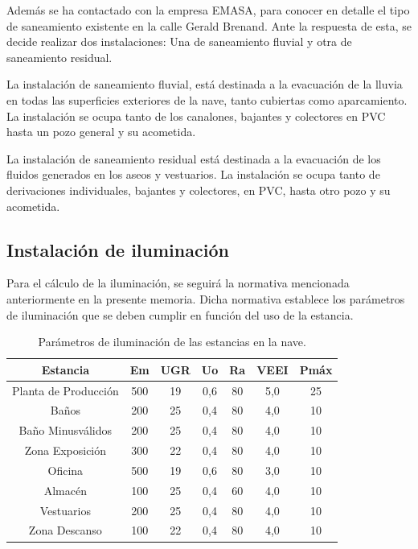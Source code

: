 \documentclass[../main.tex]{subfiles}
\begin{document}
Además se ha contactado con la empresa EMASA, para conocer en detalle el tipo de saneamiento existente en la calle Gerald Brenand. Ante la respuesta de esta, se decide realizar dos instalaciones: Una de saneamiento fluvial y otra de saneamiento residual. 

La instalación de saneamiento fluvial, está destinada a la evacuación de la lluvia en todas las superficies exteriores de la nave, tanto cubiertas como aparcamiento. La instalación se ocupa tanto de los canalones, bajantes y colectores en PVC hasta un pozo general y su acometida.

La instalación de saneamiento residual está destinada a la evacuación de los fluidos generados en los aseos y vestuarios. La instalación se ocupa tanto de derivaciones individuales, bajantes y colectores, en PVC, hasta otro pozo y su acometida.

\subsection{Instalación de iluminación}
Para el cálculo de la iluminación, se seguirá la normativa mencionada anteriormente en la presente memoria. Dicha normativa establece los parámetros de iluminación que se deben cumplir en función del uso de la estancia.

\begin{table}[H]
    \centering
    \begin{tabular}{c | c | c | c | c | c | c }
         Estancia & Em & UGR & Uo  & Ra & VEEI & Pmáx \\ \hline
         Planta de Producción & 500 & 19 & 0,6 & 80 & 5,0 & 25 \\
         Baños & 200 & 25 & 0,4 & 80 & 4,0 & 10 \\
         Baño Minusválidos & 200 & 25 & 0,4 & 80 & 4,0 & 10 \\
         Zona Exposición & 300 & 22 & 0,4 & 80 & 4,0 & 10 \\
         Oficina & 500 & 19 & 0,6 & 80 & 3,0 & 10 \\
         Almacén & 100 & 25 & 0,4 & 60 & 4,0 & 10 \\
         Vestuarios & 200 & 25 & 0,4 & 80 & 4,0 & 10 \\
         Zona Descanso& 100 & 22 & 0,4 & 80 & 4,0 & 10 \\
    \end{tabular}
    \caption{Parámetros de iluminación de las estancias en la nave.}
\end{table}
\end{document}
